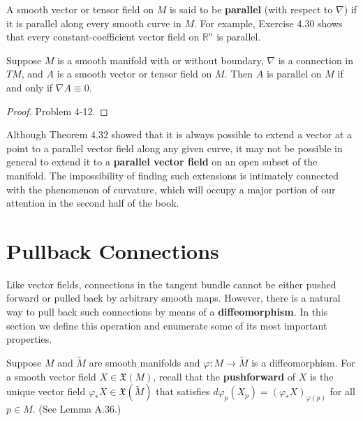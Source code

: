 A smooth vector or tensor field on $M$ is said to be \textbf{parallel} (with respect to $\nabla$) if it is parallel along every smooth curve in $M$. For example, Exercise 4.30 shows that every constant-coefficient vector field on $\mathbb{R}^n$ is parallel.

\begin{proposition}
\label{prop:parallel-field-characterization}
Suppose $M$ is a smooth manifold with or without boundary, $\nabla$ is a connection in $TM$, and $A$ is a smooth vector or tensor field on $M$. Then $A$ is parallel on $M$ if and only if $\nabla A \equiv 0$.
\end{proposition}

\begin{proof}
Problem 4-12.
\end{proof}

Although Theorem 4.32 showed that it is always possible to extend a vector at a point to a parallel vector field along any given curve, it may not be possible in general to extend it to a \textbf{parallel vector field} on an open subset of the manifold. The impossibility of finding such extensions is intimately connected with the phenomenon of curvature, which will occupy a major portion of our attention in the second half of the book.

\section{Pullback Connections}

Like vector fields, connections in the tangent bundle cannot be either pushed forward or pulled back by arbitrary smooth maps. However, there is a natural way to pull back such connections by means of a \textbf{diffeomorphism}. In this section we define this operation and enumerate some of its most important properties.

Suppose $M$ and $\tilde{M}$ are smooth manifolds and $\varphi : M \to \tilde{M}$ is a diffeomorphism. For a smooth vector field $X \in \mathfrak{X}(M)$, recall that the \textbf{pushforward} of $X$ is the unique vector field $\varphi_* X \in \mathfrak{X}(\tilde{M})$ that satisfies $d\varphi_p(X_p) = (\varphi_* X)_{\varphi(p)}$ for all $p \in M$. (See Lemma A.36.)

